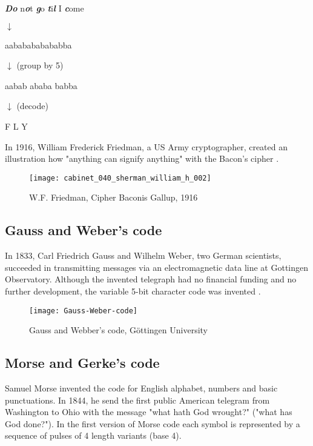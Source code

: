\textit{\textbf{Do}} n\textit{\textbf{o}}t \textit{\textbf{g}}o \textit{\textbf{t}}i\textit{\textbf{l}} I \textit{\textbf{c}}ome 

$\downarrow$

aababababababba  

$\downarrow$ (group by 5)  

aabab ababa babba

$\downarrow$ (decode)

F L Y

In 1916, William Frederick Friedman, a US Army cryptographer, created an illustration how "anything can signify anything" with the Bacon's cipher \cite{fiedmanbaconcipher}.

\begin{figure}[h]
    \texttt{[image: cabinet\_040\_sherman\_william\_h\_002]}
    \captionsetup{justification=centering,margin=1cm}
    \caption{W.F. Friedman, Cipher Baconis Gallup, 1916}
\end{figure}



\subsection{Gauss and Weber's code}

In 1833, Carl Friedrich Gauss and Wilhelm Weber, two German scientists, succeeded in transmitting messages via an electromagnetic data line at Gottingen Observatory. Although the invented telegraph had no financial funding and no further development, the variable 5-bit character code was invented \cite{martin2010technological}.

\begin{figure}[h]
    \texttt{[image: Gauss-Weber-code]}
    \captionsetup{justification=centering,margin=1cm}
    \caption{Gauss and Webber's code, Göttingen University}
\end{figure}



\subsection{Morse and Gerke's code}

Samuel Morse invented the code for English alphabet, numbers and basic punctuations. In 1844, he send the first public American telegram from Washington to Ohio with the message "what hath God wrought?" ("what has God done?"). In the first version of Morse code each symbol is represented by a sequence of pulses of 4 length variants (base 4).

